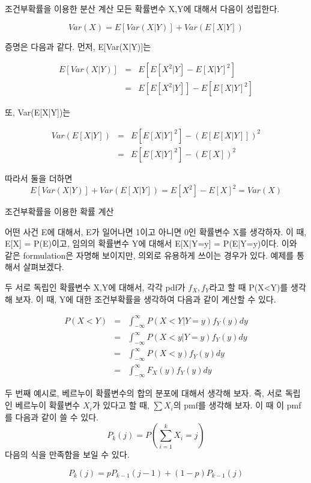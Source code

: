 \documentclass{beamer}
\begin{document}
\begin{frame}{조건부확률을 이용한 분산 계산}
모든 확률변수 X,Y에 대해서 다음이 성립한다. 

\begin{equation} 
Var(X) = E[Var(X|Y)] + Var(E[X|Y])
\end{equation}
 
증명은 다음과 같다. 먼저, E[Var(X|Y)]는

\begin{eqnarray} 
E[Var(X|Y)] &=& E[E[X^2|Y] - E[X|Y]^2] \\ 
 &=& E[E[X^2|Y]] - E[E[X|Y]^2] 
\end{eqnarray}

또, Var(E[X|Y])는 

\begin{eqnarray} 
Var(E[X|Y]) &=& E[E[X|Y]^2] - (E[E[X|Y]])^2 \\ 
 &=& E[E[X|Y]^2] - (E[X])^2 
\end{eqnarray}

따라서 둘을 더하면 
\begin{equation} 
E[Var(X|Y)] + Var(E[X|Y]) = E[X^2]-E[X]^2 = Var(X)
\end{equation}

\end{frame}

\begin{frame}[allowframebreaks]{조건부확률을 이용한 확률 계산} 

어떤 사건 E에 대해서, E가 일어나면 1이고 아니면 0인 확률변수 X를 생각하자. 이 때, E[X] = P(E)이고, 임의의 확률변수 Y에 대해서 E[X|Y=y] = P(E|Y=y)이다. 이와 같은 formulation은 자명해 보이지만, 의외로 유용하게 쓰이는 경우가 있다. 예제를 통해서 살펴보겠다. 

두 서로 독립인 확률변수 X,Y에 대해서, 각각 pdf가 $f_X, f_Y$라고 할 때 P(X<Y)를 생각해 보자. 이 때, Y에 대한 조건부확률을 생각하여 다음과 같이 계산할 수 있다. 

\begin{eqnarray} 
P(X<Y) &=& \int^{\infty}_{-\infty} P(X<Y|Y=y)f_Y(y) dy \\
&=& \int^{\infty}_{-\infty} P(X<y|Y=y)f_Y(y) dy \\ 
&=& \int^{\infty}_{-\infty} P(X<y)f_Y(y) dy \\
&=& \int^{\infty}_{-\infty} F_X(y) f_Y(y) dy
\end{eqnarray}


두 번째 예시로, 베르누이 확률변수의 합의 분포에 대해서 생각해 보자. 즉, 서로 독립인 베르누이 확률변수 $X_i$가 있다고 할 때, $\sum X_i$의 pmf를 생각해 보자. 이 때 이 pmf를 다음과 같이 쓸 수 있다. 
\begin{equation} 
P_k(j) = P(\sum_{i=1}^{k} X_i = j)
\end{equation}
 다음의 식을 만족함을 보일 수 있다. 

\begin{equation} 
P_k(j) = p P_{k-1}(j-1) + (1-p)P_{k-1}(j)
\end{equation}

\end{frame}
\end{document}
